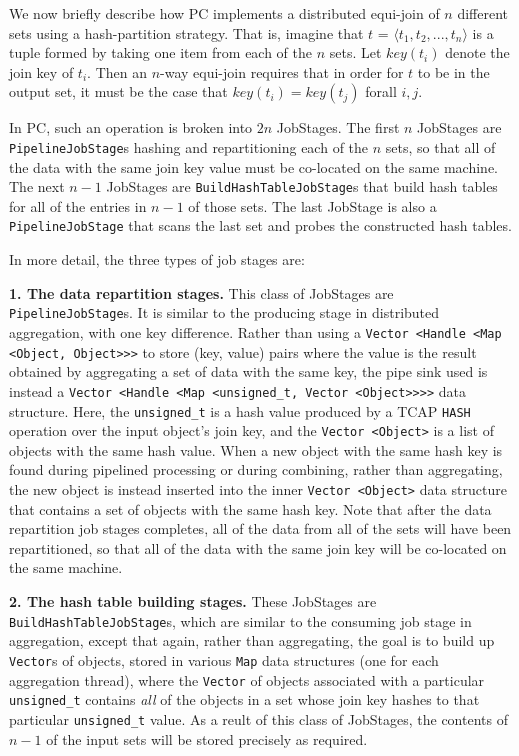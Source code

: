 We now briefly describe how PC implements a distributed equi-join of $n$ different sets using a hash-partition strategy.  
That is, imagine that $t$ = $\langle t_1, t_2, ..., t_n \rangle$ is a
tuple formed by taking one item from each of the $n$ sets.  Let $key(t_i)$ denote the join key of $t_i$.  Then an $n$-way equi-join requires that
in order for $t$ to be in the output set, it must be the case that
$key(t_i) = key(t_j)$ forall $i, j$. 

In PC, such an operation is broken into $2n$ JobStages. The first $n$
JobStages are \texttt{PipelineJobStage}s hashing and repartitioning each of the $n$ sets, so that all of the data with the same join key value
must be co-located on the same machine.  The next $n - 1$ JobStages
are \texttt{BuildHashTableJobStage}s that build hash tables for all of the
entries in $n - 1$ of those sets.  The last JobStage is also a 
\texttt{PipelineJobStage} that scans the last set and
probes the constructed hash tables.  

In more detail, the three types of job stages are:

\vspace{5pt}
{\bf 1. The data repartition stages.} This class of JobStages are
\texttt{PipelineJobStage}s. It is similar to the producing stage in distributed
aggregation, with one key difference.
Rather than using a \texttt{Vector <Handle <Map <Object, Object>>>} to store (key, value) pairs where the value is the result obtained by aggregating a set of
data with the same key, the pipe sink used is instead a \texttt{Vector <Handle <Map <unsigned\_t, Vector <Object>>>>} data structure.  Here, the
\texttt{unsigned\_t} is a hash value produced by a TCAP \texttt{HASH} operation over the input object's join key, and the \texttt{Vector <Object>} is a list of objects
with the same hash value.  
When a new object with the same hash key is found during pipelined processing or during combining, rather than aggregating, the new object is instead inserted
into the inner \texttt{Vector <Object>} data structure that contains a set of objects with the same hash key.
Note that after the data repartition job stages completes, all of the data from all of the sets will have been repartitioned, so that all of the data with the same join
key will be co-located on the same machine.

\vspace{5pt}
{\bf 2. The hash table building stages.} These JobStages are
\texttt{BuildHashTableJobStage}s, which are similar to the consuming job stage in aggregation, 
except that again, rather than aggregating, the goal is to build up \texttt{Vector}s of objects, stored in various \texttt{Map} data structures (one for each
aggregation thread), where the \texttt{Vector} of objects associated with a particular 
\texttt{unsigned\_t} contains \emph{all} of the objects in a set whose join key hashes to that particular \texttt{unsigned\_t} value.
As a reult of this class of JobStages, the contents of $n - 1$ of the input sets will be stored precisely as required.

